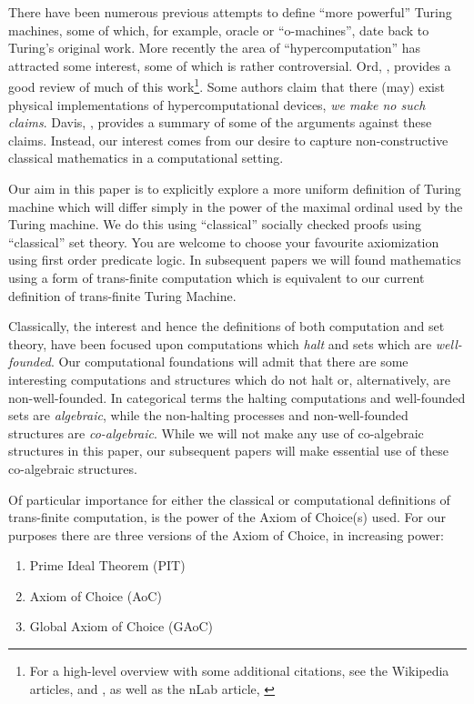 \documentclass[a4paper,openany]{amsart}
\begin{document}
There have been numerous previous attempts to define ``more powerful'' Turing machines,
some of which, for example, oracle or ``o-machines'', date back to Turing's original work.
More recently the area of ``hypercomputation'' has attracted some interest, some of which
is rather controversial. Ord, \cite{ord2006hyperComputation}, provides a good review of
much of this work\footnote{For a high-level overview with some additional citations, see
the Wikipedia articles, \cite{wikipedia2015hyperComputation} and
\cite{wikipedia2015superRecursiveAlgorithm}, as well as the nLab article,
\cite{nLab2015hyperComputation}}. Some authors claim that there (may) exist physical
implementations of hypercomputational devices, \emph{we make \emph{no} such claims}.
Davis, \cite{davis2004hyperComputation}, provides a summary of some of the arguments
against these claims. Instead, our interest comes from our desire to capture
non-constructive classical mathematics in a computational setting.


Our aim in this paper is to explicitly explore a more uniform definition of Turing machine
which will differ simply in the power of the maximal ordinal used by the Turing machine.
We do this using ``classical'' socially checked proofs using ``classical'' set theory. You
are welcome to choose your favourite axiomization using first order predicate logic. In
subsequent papers we will found mathematics using a form of trans-finite computation which
is equivalent to our current definition of trans-finite Turing Machine. 

Classically, the interest and hence the definitions of both computation and set theory,
have been focused upon computations which \emph{halt} and sets which are
\emph{well-founded}. Our computational foundations will admit that there are some
interesting computations and structures which do not halt or, alternatively, are
non-well-founded. In categorical terms the halting computations and well-founded sets are
\emph{algebraic}, while the non-halting processes and non-well-founded structures are
\emph{co-algebraic}. While we will not make any use of co-algebraic structures in this
paper, our subsequent papers will make essential use of these co-algebraic structures.

Of particular importance for either the classical or computational definitions of
trans-finite computation, is the power of the Axiom of Choice(s) used. For our purposes
there are three versions of the Axiom of Choice, in increasing power:
%
\begin{enumerate}
\item Prime Ideal Theorem (PIT)
\item Axiom of Choice (AoC)
\item Global Axiom of Choice (GAoC)
\end{enumerate}
\end{document}
